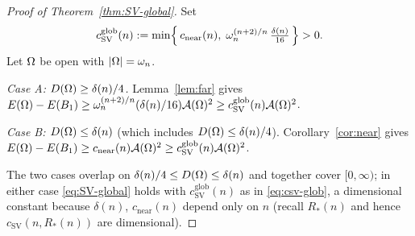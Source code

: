 \begin{proof}[Proof of Theorem~\ref{thm:SV-global}]
Set
\begin{equation}\label{eq:csv-glob}
   c_{\mathrm{SV}}^{\mathrm{glob}}(n)
   :=\min\Bigl\{\,c_{\mathrm{near}}(n),\;
   \omega_n^{(n+2)/n}\,\tfrac{\delta(n)}{16}\,\Bigr\}>0 .
\end{equation}
Let $\Omega$ be open with $\left|\Omega\right|=\omega_n$.

\emph{Case A: $D(\Omega)\ge\delta(n)/4$.} Lemma~\ref{lem:far} gives
$E(\Omega)-E(B_1)\ge\omega_n^{(n+2)/n}(\delta(n)/16)\mathcal A(\Omega)^2
\ge c_{\mathrm{SV}}^{\mathrm{glob}}(n)\mathcal A(\Omega)^2$.

\emph{Case B: $D(\Omega)\le\delta(n)$} (which includes
$D(\Omega)\le\delta(n)/4$). Corollary~\ref{cor:near} gives
$E(\Omega)-E(B_1)\ge c_{\mathrm{near}}(n)\mathcal A(\Omega)^2
\ge c_{\mathrm{SV}}^{\mathrm{glob}}(n)\mathcal A(\Omega)^2$.

The two cases overlap on $\delta(n)/4\le D(\Omega)\le\delta(n)$ and together
cover $[0,\infty)$; in either case \eqref{eq:SV-global} holds with
$c_{\mathrm{SV}}^{\mathrm{glob}}(n)$ as in \eqref{eq:csv-glob}, a
dimensional constant because $\delta(n)$, $c_{\mathrm{near}}(n)$ depend
only on $n$ (recall $R_*(n)$ and hence $c_{\mathrm{SV}}(n,R_*(n))$ are
dimensional).


\end{proof}
